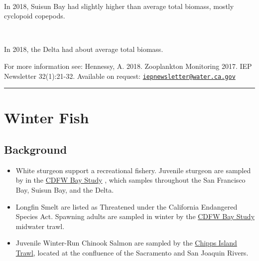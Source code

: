 \documentclass[
]{book}
\providecommand{\tightlist}{%
  \setlength{\itemsep}{0pt}\setlength{\parskip}{0pt}}
\begin{document}
\begin{panel-grid}
\begin{columns-nocenter}
\begin{column40}
~

\end{column40}

\begin{column800}

In 2018, Suisun Bay had slightly higher than average total biomass, mostly cyclopoid copepods.

\end{column800}

\begin{column40}

~

\end{column40}

\begin{column800}

In 2018, the Delta had about average total biomass.

\end{column800}

\end{columns-nocenter}

\end{panel-grid}

\begin{disclaimer}
For more information see: Hennessy, A. 2018. Zooplankton Monitoring
2017. IEP Newsletter 32(1):21-32. Available on request:
\href{mailto:iepnewsletter@water.ca.gov}{\nolinkurl{iepnewsletter@water.ca.gov}}
\end{disclaimer}

\begin{center}\rule{0.5\linewidth}{0.5pt}\end{center}

\hypertarget{winter-fish}{%
\section{Winter Fish}\label{winter-fish}}

\hypertarget{background-4}{%
\subsection{Background}\label{background-4}}

\begin{itemize}
\tightlist
\item
  White sturgeon support a recreational fishery. Juvenile sturgeon are sampled by in the \href{https://wildlife.ca.gov/Conservation/Delta/Bay-Study}{CDFW Bay Study} , which samples throughout the San Francisco Bay, Suisun Bay, and the Delta.
\item
  Longfin Smelt are listed as Threatened under the California Endangered Species Act. Spawning adults are sampled in winter by the \href{https://wildlife.ca.gov/Conservation/Delta/Bay-Study}{CDFW Bay Study} midwater trawl.
\item
  Juvenile Winter-Run Chinook Salmon are sampled by the \href{https://www.fws.gov/lodi/juvenile_fish_monitoring_program/jfmp_index.htm}{Chipps Island Trawl}, located at the confluence of the Sacramento and San Joaquin Rivers.
\end{itemize}
\end{document}
